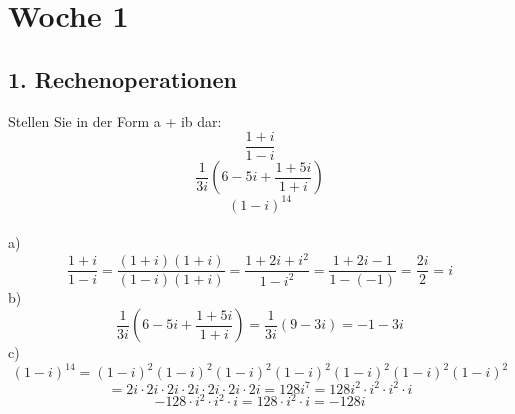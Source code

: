 \documentclass{article}
\begin{document}
    \section{Woche 1}
    \subsection{1. Rechenoperationen}
    Stellen Sie in der Form a + ib dar:
    \begin{equation*}
        \frac{1+i}{1-i}
    \end{equation*}
    \begin{equation*}
        \frac{1}{3i}\left(6-5i+\frac{1+5i}{1+i}\right)
    \end{equation*}
    \begin{equation*}
        \left(1-i\right)^{14}
    \end{equation*}
    \\
    a) \begin{equation*}
        \frac{1+i}{1-i} = \frac{\left(1+i\right)\left(1+i\right)}{\left(1-i\right)\left(1+i\right)}=\frac{1+2i+i^2}{1-i^2}=\frac{1+2i-1}{1-\left(-1\right)}=\frac{2i}{2}=i
    \end{equation*}
    b) \begin{equation*}
        \frac{1}{3i}\left(6-5i+\frac{1+5i}{1+i}\right)=\frac{1}{3i}\left(9-3i\right)=-1-3i
    \end{equation*}
    c) \begin{equation*}
        \left(1-i\right)^{14}=\left(1-i\right)^2\left(1-i\right)^2\left(1-i\right)^2\left(1-i\right)^2\left(1-i\right)^2\left(1-i\right)^2\left(1-i\right)^2
    \end{equation*}
    \begin{equation*}
        =2i\cdot 2i\cdot 2i\cdot 2i\cdot 2i\cdot 2i\cdot 2i=128i^7=128i^2\cdot i^2\cdot i^2\cdot i
    \end{equation*}
    \begin{equation*}
        -128\cdot i^2\cdot i^2\cdot i=128\cdot i^2\cdot i=-128i
    \end{equation*}
\end{document}

